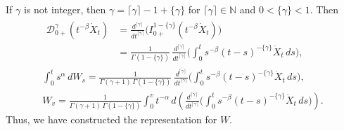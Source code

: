 \documentclass{article}
\newcommand{\dotX}{\dot{X}}
\theoremstyle{plain}
\theoremstyle{remark}
\theoremstyle{definition}
\begin{document}
If $\gamma$ is not integer, then $\gamma = \lceil\gamma\rceil - 1 + \{\gamma\}$
for $\lceil\gamma\rceil\in\mathbb{N}$ and $0<\{\gamma\}<1$.
Then
\begin{gather*}
	\begin{aligned}
	\mathcal{D}_{0+}^\gamma (t^{-\beta} \dotX_t)
		&=
	\frac{d^{\lceil\gamma\rceil}}
	    {dt^{\lceil\gamma\rceil}}
	\bigl( I^{1-\{\gamma\}}_{0+} (t^{-\beta} \dotX_t) \bigr)
		\\&=
	\frac{1}{\Gamma(1{-}\{\gamma\})} \,
	\frac{d^{\lceil\gamma\rceil}}
	    {dt^{\lceil\gamma\rceil}} \!
	\biggl(\int_0^t s^{-\beta} (t-s)^{-\{\gamma\}} \dotX_t \, ds \biggr),
	\end{aligned}\\
\int_0^t s^\alpha \, dW_s =
	\frac{1}{\Gamma(\gamma+1)\,\Gamma(1{-}\{\gamma\})} \,
	\frac{d^{\lceil\gamma\rceil}}
	    {dt^{\lceil\gamma\rceil}} \!
	\biggl(\int_0^t s^{-\beta} (t-s)^{-\{\gamma\}} \dotX_t \, ds \biggr),
	\\
	W_v =
	\frac{1}{\Gamma(\gamma+1)\,\Gamma(1{-}\{\gamma\})}
	\int_0^v
	t^{-\alpha}
	\, d\!\left(
	\frac{d^{\lceil\gamma\rceil}}
	    {dt^{\lceil\gamma\rceil}} \!
	\biggl(\int_0^t s^{-\beta} (t-s)^{-\{\gamma\}} \dotX_t \, ds \biggr)
	\right) .
\end{gather*}
Thus, we have constructed the representation for $W$.
	
\end{document}
